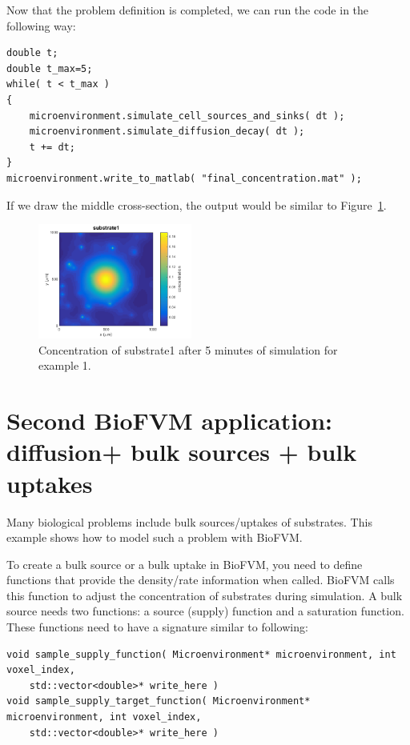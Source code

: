 \documentclass[11pt]{article}
\begin{document}
Now that the problem definition is completed, we can run the code in the following way:

\begin{verbatim}
double t;
double t_max=5;
while( t < t_max )
{
    microenvironment.simulate_cell_sources_and_sinks( dt );
    microenvironment.simulate_diffusion_decay( dt );
    t += dt;
}
microenvironment.write_to_matlab( "final_concentration.mat" );
\end{verbatim}


If we draw the middle cross-section, the output would be similar to Figure~\ref{./figures/tutorial1_fig2}.

\begin{figure}[h]
\centering
\includegraphics[width=0.45\textwidth]{./figures/tutorial1_fig2.png}
\caption{Concentration of substrate1 after 5 minutes of simulation for example 1.}
\label{./figures/tutorial1_fig2}
\end{figure}

\section{Second BioFVM application: diffusion+ bulk sources + bulk uptakes}
\label{second_example}
Many biological problems include bulk sources/uptakes of substrates. This example shows how to model such a problem
with BioFVM.

To create a bulk source or a bulk uptake in BioFVM, you need to define functions that provide the density/rate information when called.
BioFVM calls this function to adjust the concentration of substrates during simulation. A bulk source needs two functions: a source
(supply) function and a saturation function. These functions need to have a signature similar to following:


\begin{verbatim}
void sample_supply_function( Microenvironment* microenvironment, int voxel_index,
    std::vector<double>* write_here )
void sample_supply_target_function( Microenvironment* microenvironment, int voxel_index,
    std::vector<double>* write_here )
\end{verbatim}
\end{document}
